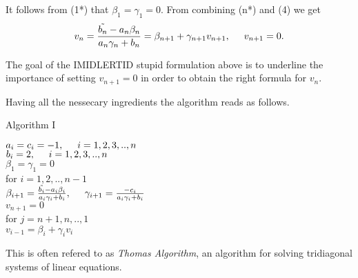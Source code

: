 \documentclass[11pt,a4paper,english]{article}
\newcommand{\spac}{\hspace{5mm}}
\begin{document}
It follows from (1*) that $\beta_1 = \gamma_1 = 0$.
From combining (n*) and (4) we get 
\begin{align*}
v_n = \frac{\tilde{b_n}-a_n \beta_n}{a_n \gamma_n + b_n} = \beta_{n+1} + \gamma_{n+1} v_{n+1}, \spac v_{n+1} = 0.
\end{align*}

The goal of the IMIDLERTID stupid formulation above is to underline the importance of setting $v_{n+1}=0$ in order to obtain the right formula for $v_n$.

Having all the nessecary ingredients the algorithm reads as follows.
\vspace{0.5cm}\\
\centerline{Algorithm I}
\begin{tcolorbox}
$a_i = c_i = -1, \spac  i=1,2,3,..,n$ \\
$b_i = 2, \spac  i=1,2,3,..,n $\\
$\beta_1 = \gamma_1 = 0$ \\
for $i=1,2,..,n-1$ \\ \vspace{0.5cm} 
 \spac $ \beta_{i+1} = \frac{\tilde{b_i}-a_i \beta_i}{a_i \gamma_i + b_i} , \spac \gamma_{i+1}=\frac{-c_i}{a_i \gamma_i + b_i} $ \vspace{0.2cm}  \\
 $v_{n+1} = 0$ \\
for $j=n+1, n,..,1$ \\ \vspace{0.5cm} 
 \spac $v_{i-1} = \beta_i + \gamma_i v_i$

\end{tcolorbox} 


This is often refered to as \emph{Thomas Algorithm}, an algorithm for solving tridiagonal systems of linear equations.
\end{document}
